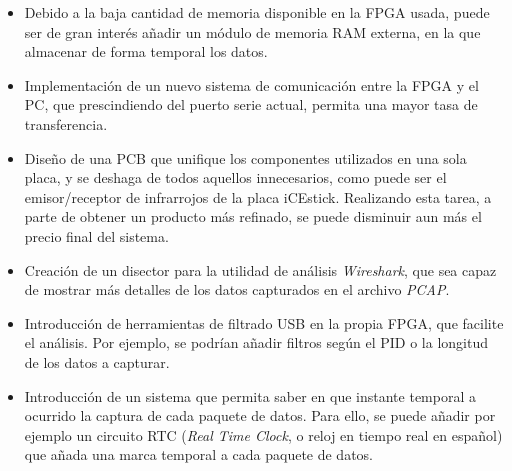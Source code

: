 \begin{itemize}
    \item Debido a la baja cantidad de memoria disponible en la FPGA usada, puede ser de gran interés añadir un módulo de memoria RAM externa, en la que almacenar de forma temporal los datos.
    
    \item Implementación de un nuevo sistema de comunicación entre la FPGA y el PC, que prescindiendo del puerto serie actual, permita una mayor tasa de transferencia.
    
    \item Diseño de una PCB que unifique los componentes utilizados en una sola placa, y se deshaga de todos aquellos innecesarios, como puede ser el emisor/receptor de infrarrojos de la placa iCEstick. Realizando esta tarea, a parte de obtener un producto más refinado, se puede disminuir aun más el precio final del sistema.
    
    \item Creación de un disector para la utilidad de análisis \emph{Wireshark}, que sea capaz de mostrar más detalles de los datos capturados en el archivo \emph{PCAP}.
    
    \item Introducción de herramientas de filtrado USB en la propia FPGA, que facilite el análisis. Por ejemplo, se podrían añadir filtros según el PID o la longitud de los datos a capturar.

    \item Introducción de un sistema que permita saber en que instante temporal a ocurrido la captura de cada paquete de datos. Para ello, se puede añadir por ejemplo un circuito RTC (\emph{Real Time Clock}, o reloj en tiempo real en español) que añada una marca temporal a cada paquete de datos.
\end{itemize}






